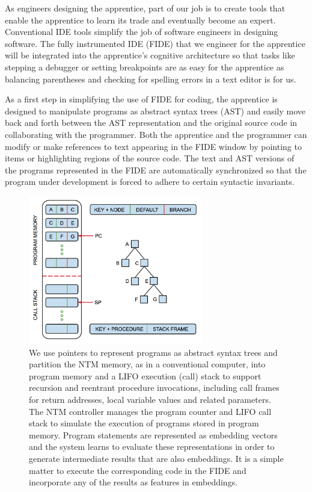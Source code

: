 \documentclass[letterpaper,11pt]{article}
\def\urlh#1{{}}
\begin{document}
As engineers designing the apprentice, part of our job is to create tools that enable the apprentice to learn its trade and eventually become an expert. Conventional IDE tools simplify the job of software engineers in designing software. The fully instrumented IDE (FIDE) that we engineer for the apprentice will be integrated into the apprentice’s cognitive architecture so that tasks like stepping a debugger or setting breakpoints are as easy for the apprentice as balancing parentheses and checking for spelling errors in a text editor is for us.

As a first step in simplifying the use of FIDE for coding, the apprentice is designed to manipulate programs as abstract syntax trees (AST) and easily move back and forth between the AST representation and the original source code in collaborating with the programmer. Both the apprentice and the programmer can modify or make references to text appearing in the FIDE window by pointing to items or highlighting regions of the source code. The text and AST versions of the programs represented in the FIDE are automatically synchronized so that the program under development is forced to adhere to certain syntactic invariants. 


\begin{figure}
%
  \begin{center} 
    \includegraphics[width=3in]{./figures/Differentiable_Structured_Programs.jpg} %
  \end{center}
%
  \caption{We use pointers to represent programs as abstract syntax trees and partition the NTM memory, as in a conventional computer, into program memory and a LIFO execution (call) stack to support recursion and reentrant procedure invocations, including call frames for return addresses, local variable values and related parameters. The NTM controller manages the program counter and LIFO call stack to simulate the execution of programs stored in program memory. Program statements are represented as embedding vectors and the system learns to evaluate these representations in order to generate intermediate results that are also embeddings. It is a simple matter to execute the corresponding code in the FIDE and incorporate any of the results as features in embeddings.}
%
  \label{fig_programs}
%
\end{figure}
\end{document}
